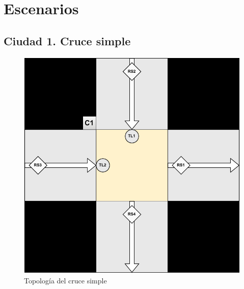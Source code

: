 \chapter{Escenarios}
    \label{chap:six}
    
\section{Ciudad 1. Cruce simple}
\begin{figure}[H]
    \centering
    \includegraphics[width=1\linewidth]{text/image/DCruc-CSimple-Topologia.pdf}
    \caption{Topología del cruce simple}
    \label{fig:cruce_simple_topologia}
\end{figure}

\newpage
